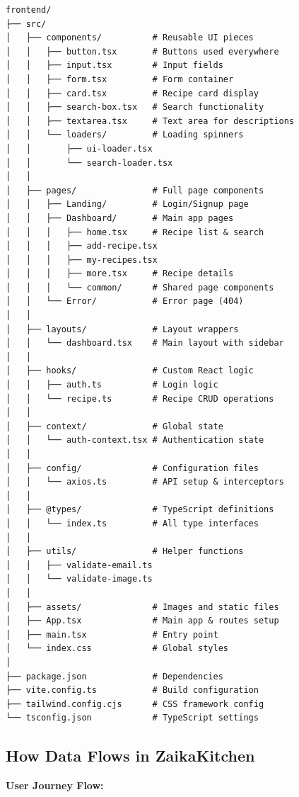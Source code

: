 \documentclass[12pt]{article}
\begin{document}
\begin{lstlisting}
frontend/
├── src/
│   ├── components/          # Reusable UI pieces
│   │   ├── button.tsx       # Buttons used everywhere
│   │   ├── input.tsx        # Input fields
│   │   ├── form.tsx         # Form container
│   │   ├── card.tsx         # Recipe card display
│   │   ├── search-box.tsx   # Search functionality
│   │   ├── textarea.tsx     # Text area for descriptions
│   │   └── loaders/         # Loading spinners
│   │       ├── ui-loader.tsx
│   │       └── search-loader.tsx
│   │
│   ├── pages/               # Full page components
│   │   ├── Landing/         # Login/Signup page
│   │   ├── Dashboard/       # Main app pages
│   │   │   ├── home.tsx     # Recipe list & search
│   │   │   ├── add-recipe.tsx
│   │   │   ├── my-recipes.tsx
│   │   │   ├── more.tsx     # Recipe details
│   │   │   └── common/      # Shared page components
│   │   └── Error/           # Error page (404)
│   │
│   ├── layouts/             # Layout wrappers
│   │   └── dashboard.tsx    # Main layout with sidebar
│   │
│   ├── hooks/               # Custom React logic
│   │   ├── auth.ts          # Login logic
│   │   └── recipe.ts        # Recipe CRUD operations
│   │
│   ├── context/             # Global state
│   │   └── auth-context.tsx # Authentication state
│   │
│   ├── config/              # Configuration files
│   │   └── axios.ts         # API setup & interceptors
│   │
│   ├── @types/              # TypeScript definitions
│   │   └── index.ts         # All type interfaces
│   │
│   ├── utils/               # Helper functions
│   │   ├── validate-email.ts
│   │   └── validate-image.ts
│   │
│   ├── assets/              # Images and static files
│   ├── App.tsx              # Main app & routes setup
│   ├── main.tsx             # Entry point
│   └── index.css            # Global styles
│
├── package.json             # Dependencies
├── vite.config.ts           # Build configuration
├── tailwind.config.cjs      # CSS framework config
└── tsconfig.json            # TypeScript settings
\end{lstlisting}

\subsection{How Data Flows in ZaikaKitchen}

\begin{center}
\textbf{User Journey Flow:}
\end{center}
\end{document}
